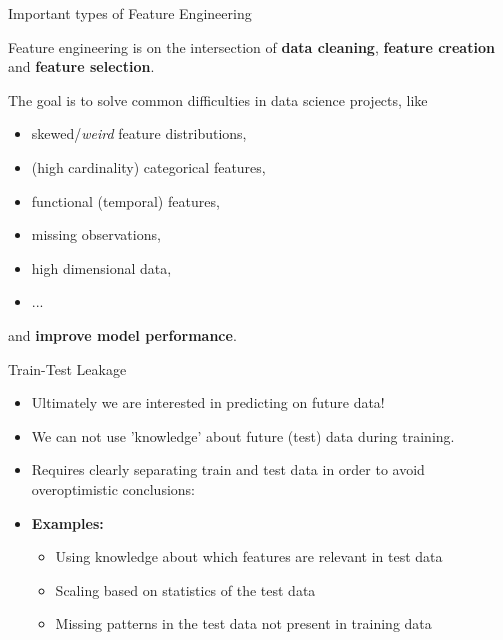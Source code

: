 \documentclass[11pt,compress,t,notes=noshow, xcolor=table]{beamer}
\date{}
\begin{document}



\begin{vbframe}{Important types of Feature Engineering}

Feature engineering is on the intersection of \textbf{data cleaning}, \textbf{feature creation} and \textbf{feature selection}.

\lz

The goal is to solve common difficulties in data science projects, like

\begin{itemize}
\item skewed/\textit{weird} feature distributions,
\item (high cardinality) categorical features,
\item functional (temporal) features,
\item missing observations,
\item high dimensional data,
\item ...
\end{itemize}

and \textbf{improve model performance}.

\end{vbframe}


\begin{vbframe}{Train-Test Leakage}

\begin{itemize}
\item Ultimately we are interested in predicting on future data!

\item We can not use 'knowledge' about future (test) data during training.

\item Requires clearly separating train and test data in order to avoid overoptimistic conclusions:

\item \textbf{Examples:}

  \begin{itemize}
  \item Using knowledge about which features are relevant in test data
  
  \item Scaling based on statistics of the test data 
  
  \item Missing patterns in the test data not present in training data
  \end{itemize}
\end{itemize}

\end{vbframe}
\end{document}
